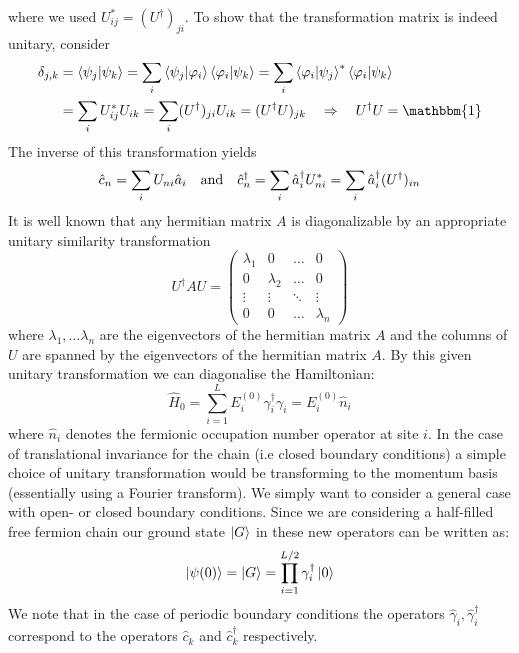 \documentclass[11pt, a4paper]{article}
\theoremstyle{definition} %
\begin{document}
	 where we used $U_{ij}^* = (U^\dagger)_{ji}$. To show that the transformation matrix is indeed unitary, consider
	 \begin{align}
	 	\delta_{j,k} &= \braket{\psi_j}{\psi_k} = \sum_i \braket{\psi_j}{\varphi_i}\braket{\varphi_i}{\psi_k} = \sum_i \braket{\varphi_i}{\psi_j}^* \braket{\varphi_i}{\psi_k} \\
	 	&= \sum_i U_{ij}^* U_{ik} = \sum_i (U^\dagger)_{ji} U_{ik} = (U^\dagger U)_{jk} \quad \Rightarrow \quad U^\dagger U = \mathbbm{1}
	 \end{align}
	 The inverse of this transformation yields
	 \begin{equation}
	 	\hat{c}_n = \sum_i U_{ni} \hat{a}_i \qq{and} \hat{c}_n^\dagger = \sum_i \hat{a}_i^\dagger U^*_{ni} = \sum_i \hat {a}_i^\dagger (U^\dagger)_{in}
	 \end{equation}
	 It is well known that any hermitian matrix $A$ is diagonalizable by an appropriate unitary similarity transformation
	 \begin{equation}
	 	U^\dagger A U = \begin{pmatrix}
	 		\lambda_1 & 0 &\dots & 0 \\
	 		0 & \lambda_2 & \dots & 0 \\
	 		\vdots & \vdots & \ddots & \vdots \\
	 		0 & 0 & \dots & \lambda_n
	 	\end{pmatrix}
	 \end{equation}
	 where $\lambda_1, \dots \lambda_n$ are the eigenvectors of the hermitian matrix $A$ and the columns of $U$ are spanned by the eigenvectors of the hermitian matrix $A$. By this given unitary transformation we can diagonalise the Hamiltonian:
	 \begin{equation}
	 	\hat{H}_0 = \sum_{i=1}^L E_i^{(0)} \gamma_i^\dagger \gamma_i = E_i^{(0)} \hat{n}_i
	 \end{equation}
	 where $\hat{n}_i$ denotes the fermionic occupation number operator at site $i$. In the case of translational invariance for the chain (i.e closed boundary conditions) a simple choice of unitary transformation would be transforming to the momentum basis (essentially using a Fourier transform). We simply want to consider a general case with open- or closed boundary conditions. Since we are considering a half-filled free fermion chain our ground state $\ket{G}$ in these new operators can be written as:
	 \begin{equation}
	 	\ket{\psi(0)} =\ket{G} = \prod_{i=1}^{L/2} \gamma_i^\dagger \ket{0}
	 \end{equation}
	 We note that in the case of periodic boundary conditions the operators $\hat{\gamma}_i, \hat{\gamma}_i^\dagger$ correspond to the operators $\hat{c}_k$ and $\hat{c}_k^\dagger$ respectively.
\end{document}
